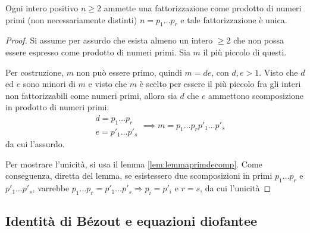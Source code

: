 \documentclass[11pt, a4paper]{scrartcl}
\theoremstyle{definition}
\numberwithin{esempio}{section}
\theoremstyle{definition}
\numberwithin{obs}{section}
\numberwithin{nota}{section}
\numberwithin{equation}{subsection}
\begin{document}
\begin{teorema}
	{}{}
	Ogni intero positivo $n\ge   2$ ammette una fattorizzazione come prodotto di numeri primi (non necessariamente distinti) $n=p_1\ldots p_r$ e tale fattorizzazione \`e unica.
	\begin{proof}
		Si assume per assurdo che esista almeno un intero $\ge  2 $ che non possa essere espresso come prodotto di numeri primi.
		Sia $m$ il pi\`u piccolo di questi. 

		Per costruzione, $m$ non pu\`o essere primo, quindi $m = de$, con $d,e > 1$. 
		Visto che $d$ ed $e$ sono minori di $m$ e visto che $m$ \`e scelto per essere il pi\`u piccolo fra gli interi non fattorizzabili come numeri primi, allora sia $d$ che $e$ ammettono scomposizione in prodotto di numeri primi:
		\[
		\begin{split}
			&d = p_1 \ldots p_r \\
			&e = p'_1 \ldots p'_s
		\end{split}\implies m = p_1 \ldots p_r p'_1 \ldots p'_s
		\] 
	da cui l'assurdo.	

	Per mostrare l'unicit\`a, si usa il lemma \ref{lem:lemmaprimdecomp}. 
	Come conseguenza, diretta del lemma, se esistessero due scomposizioni in primi $p_1 \ldots p_r $ e $p'_1 \ldots p'_s$, varrebbe $p_1 \ldots p_r = p'_1 \ldots p'_s\Rightarrow p_i = p'_i$ e $r = s$, da cui l'unicit\`a
	\end{proof}
\end{teorema}
\subsection{Identit\`a di B\'ezout e equazioni diofantee}
\end{document}
